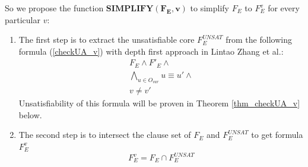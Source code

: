 \documentclass[journal]{IEEEtran}
\begin{document}
So we propose the function $\boldsymbol{SIMPLIFY(F_E,v)}$ to simplify $F_E$ to $F_E^v$ for every particular $v$:
\begin{enumerate}
\item The first step is to
extract the unsatisfiable core $F_E^{UNSAT}$ from the following formula (\ref{checkUA_v}) with depth first approach in Lintao Zhang et al.\cite{VALIDSAT}:
\begin{equation}\label{checkUA_v}
\begin{array}{c}
F_E\wedge F'_E\wedge \\
\bigwedge_{u\in O_{var}} u\equiv u'\wedge \\
v\ne v'
\end{array}
\end{equation}
Unsatisfiability of this formula will be proven in Theorem \ref{thm_checkUA_v} below.
\item The second step is to
intersect the clause set of $F_E$ and $F_E^{UNSAT}$ to get formula $F_E^v$
\begin{equation}\label{checkUA_fev}
F_E^v=F_E\cap F_E^{UNSAT}
\end{equation}
\end{enumerate}
\end{document}
